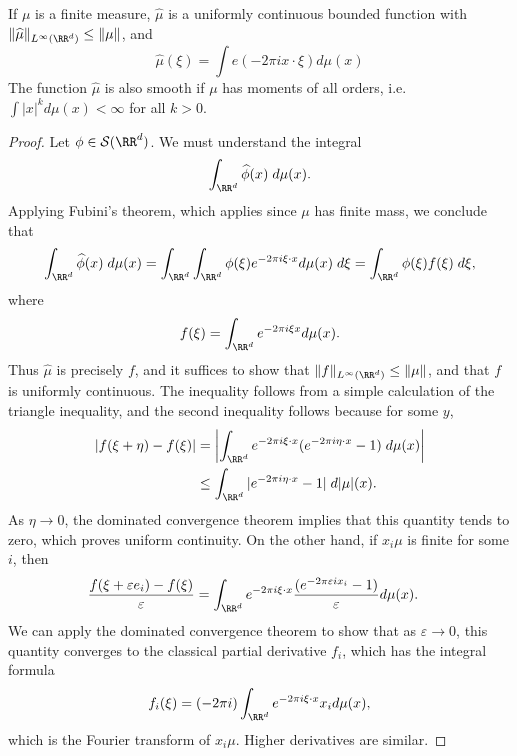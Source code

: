 \begin{theorem}
    If $\mu$ is a finite measure, $\widehat{\mu}$ is a uniformly continuous bounded function with $\| \widehat{\mu} \|_{L^\infty(\RR^d)} \leq \| \mu \|$, and
    \[ \widehat{\mu}(\xi) = \int e(- 2 \pi i x \cdot \xi) d\mu(x) \]
    The function $\widehat{\mu}$ is also smooth if $\mu$ has moments of all orders, i.e. $\int |x|^k d\mu(x) < \infty$ for all $k > 0$.
\end{theorem}
\begin{proof}
    Let $\phi \in \mathcal{S}(\RR^d)$. We must understand the integral
    \[ \int_{\RR^d} \widehat{\phi}(x)\; d\mu(x). \]
    Applying Fubini's theorem, which applies since $\mu$ has finite mass, we conclude that
    \[ \int_{\RR^d} \widehat{\phi}(x)\; d\mu(x) = \int_{\RR^d} \int_{\RR^d} \phi(\xi) e^{-2 \pi i \xi \cdot x} d\mu(x)\; d\xi = \int_{\RR^d} \phi(\xi) f(\xi)\; d\xi, \]
    where
    \[ f(\xi) = \int_{\RR^d} e^{-2 \pi i \xi x} d\mu(x). \]
    Thus $\widehat{\mu}$ is precisely $f$, and it suffices to show that $\| f \|_{L^\infty(\RR^d)} \leq \| \mu \|$, and that $f$ is uniformly continuous. The inequality follows from a simple calculation of the triangle inequality, and the second inequality follows because for some $y$,
    \begin{align*}
      |f(\xi + \eta) - f(\xi)| &= \left| \int_{\RR^d} e^{-2 \pi i \xi \cdot x} (e^{-2 \pi i \eta \cdot x} - 1)\; d\mu(x) \right|\\
      &\leq \int_{\RR^d} |e^{-2 \pi i \eta \cdot x} - 1|\; d|\mu|(x).
    \end{align*}
    As $\eta \to 0$, the dominated convergence theorem implies that this quantity tends to zero, which proves uniform continuity. On the other hand, if $x_i \mu$ is finite for some $i$, then
    \begin{align*}
      \frac{f(\xi + \varepsilon e_i) - f(\xi)}{\varepsilon} &= \int_{\RR^d} e^{-2 \pi i \xi \cdot x} \frac{(e^{- 2 \pi \varepsilon i x_i} - 1)}{\varepsilon} d\mu(x).
    \end{align*}
    We can apply the dominated convergence theorem to show that as $\varepsilon \to 0$, this quantity converges to the classical partial derivative $f_i$, which has the integral formula
    \[ f_i(\xi) = (-2 \pi i) \int_{\RR^d} e^{-2 \pi i \xi \cdot x} x_i d\mu(x), \]
    which is the Fourier transform of $x_i \mu$. Higher derivatives are similar.
\end{proof}

